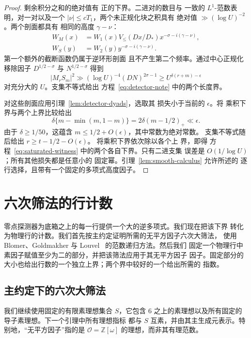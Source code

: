 \documentclass[11pt,a4paper]{article}
\numberwithin{equation}{section}
\numberwithin{figure}{section}
\theoremstyle{definition}
\theoremstyle{remark}
\begin{document}
\begin{proof}
剩余积分之和的绝对值有
正的下界。二进对的数目与
一致的 \(L^1\)-范数表明，对一对以及一个
\(|\nu|\le cT_1\)，两个未正规化块之积具有
绝对值 \(\gg(\log U)^{-2}\)。两个剖面都具有
相同的高度 \(\gamma-\nu\)：
\[
 \begin{split}
 W_M(x)&=W_1(x)V_{\le}(Dx/D_*)x^{-\sigma-i(\gamma-\nu)},\\
 W_S(y)&=W_2(y)y^{-\sigma-i(\gamma-\nu)}.
 \end{split}
\]
第一个额外的截断函数仍属于逆环形剖面
且不产生第二个频率。通过中心正规化移除因子
\(D^{1/2-\sigma}\) 与 \(N^{1/2-\sigma}\)
得到
\[
 |M_rS_m|^2\gg(\log U)^{-4}(DN)^{2\sigma-1}
 \ge U^{\delta(r+m)-\epsilon}
\]
对充分大的 \(U\)。支集不等式给出
方程~\eqref{eq:detector-note} 中的两个长度界。

对这些剖面应用引理~\ref{lem:detector-dyads}，选取其
损失小于当前的 \(\epsilon\)。将
乘积下界与两个上界比较给出
\[
 \delta\{m-\min(m,1-m)\}
   =2\delta(m-1/2)_+\ll\epsilon.
\]
由于 \(\delta\ge1/50\)，这蕴含
\(m\le1/2+O(\epsilon)\)，其中常数为绝对常数。
支集不等式随后给出
\(r\ge t-1/2-O(\epsilon)\)。
将乘积下界依次除以各个上
界，即得
方程~\eqref{eq:saturated-witness} 中的两个各自下界。只有二进支集
误差是 \(O(1/\log U)\)；所有其他损失都是任意小的
固定幂。引理~\ref{lem:smooth-calculus} 允许所述的
逐行选择，且带有一个固定的多项式高度因子。
\end{proof}

\section{六次筛法的行计数}\label{sec:sextic-row-count}

零点探测器为底箱之上的每一行提供一个大的逆多项式。我们现在把该下界
转化为物理行的计数。我们首先按主约定证明所需的无平方因子六次大筛法，
使用 Blomer、Goldmakher 与 Louvel~\cite[第 3 节]{BGL} 的范数递归方法。然后我们
固定一个物理行中素因子赋值至少为二的部分，并把该筛法应用于其无平方因子
因子。固定部分的大小也给出行数的一个独立上界；两个界中较好的一个给出所需的
指数。

\subsection{主约定下的六次大筛法}

我们继续使用固定的有限素理想集合 $S$，它包含
$6$ 之上的素理想以及所有固定的导子素理想。下一个引理中所有理想指标
都与 $S$ 互素，并由其主生成元表示。特别地，“无平方因子”指的是
$\mathcal O=\mathbb Z[\omega]$ 的理想，而非其有理范数。
\end{document}
